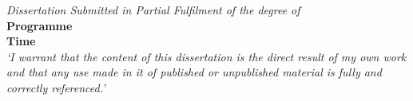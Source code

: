 \begin{center}


\normalsize \textsl{Dissertation Submitted in Partial Fulfilment of the degree of} \\
\large \textbf{Programme}\\
\large \textbf{Time}\\[5.5cm]

\large \textsl{`I warrant that the content of this dissertation is the direct result of my own work and that any use made in it of published or unpublished material is fully and correctly referenced.'}\\
\end{center}
\newpage